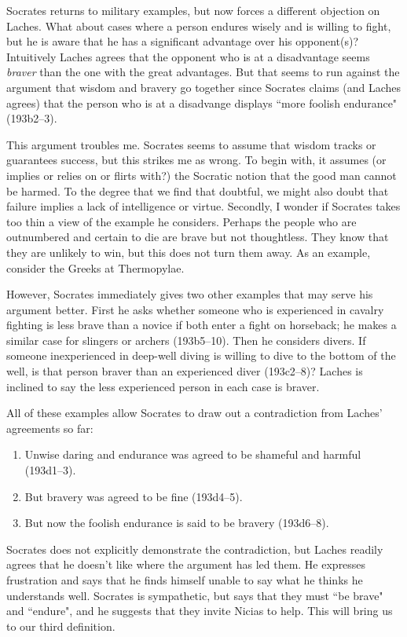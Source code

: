 \documentclass[11pt]{article}
\begin{document}
Socrates returns to military examples, but now forces a different objection on Laches.  What about cases where a person endures wisely and is willing to fight, but he is aware that he has a significant advantage over his opponent(s)?  Intuitively Laches agrees that the opponent who is at a disadvantage seems \emph{braver} than the one with the great advantages.  But that seems to run against the argument that wisdom and bravery go together since Socrates claims (and Laches agrees) that the person who is at a disadvange displays ``more foolish endurance" (193b2--3).

This argument troubles me.  Socrates seems to assume that wisdom tracks or guarantees success, but this strikes me as wrong.  To begin with, it assumes (or implies or relies on or flirts with?) the Socratic notion that the good man cannot be harmed.  To the degree that we find that doubtful, we might also doubt that failure implies a lack of intelligence or virtue.  Secondly, I wonder if Socrates takes too thin a view of the example he considers.  Perhaps the people who are outnumbered and certain to die are brave but not thoughtless.  They know that they are unlikely to win, but this does not turn them away.  As an example, consider the Greeks at Thermopylae.

However, Socrates immediately gives two other examples that may serve his argument better.  First he asks whether someone who is experienced in cavalry fighting is less brave than a novice if both enter a fight on horseback; he makes a similar case for slingers or archers (193b5--10).  Then he considers divers.  If someone inexperienced in deep-well diving is willing to dive to the bottom of the well, is that person braver than an experienced diver (193c2--8)?  Laches is inclined to say the less experienced person in each case is braver.

All of these examples allow Socrates to draw out a contradiction from Laches' agreements so far:

\begin{enumerate}
    \item Unwise daring and endurance was agreed to be shameful and harmful (193d1--3).
    \item But bravery was agreed to be fine (193d4--5).
    \item But now the foolish endurance is said to be bravery (193d6--8).
\end{enumerate}

Socrates does not explicitly demonstrate the contradiction, but Laches readily agrees that he doesn't like where the argument has led them.  He expresses frustration and says that he finds himself unable to say what he thinks he understands well.  Socrates is sympathetic, but says that they must ``be brave" and ``endure", and he suggests that they invite Nicias to help.  This will bring us to our third definition.
\end{document}
